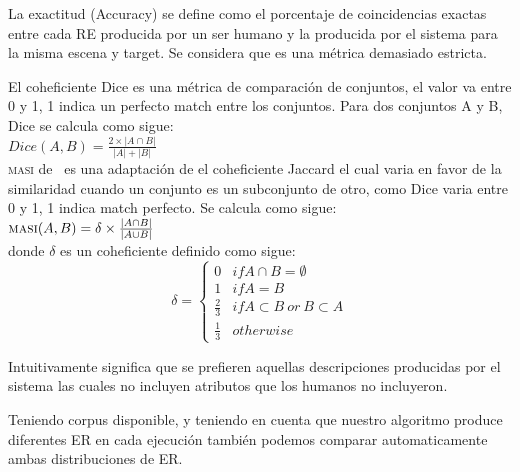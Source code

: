 La exactitud (Accuracy) se define como el porcentaje de coincidencias exactas entre cada RE producida por un ser humano y la producida por el sistema para la misma escena y target. Se considera que es una m\'etrica demasiado estricta.

El coheficiente Dice es una m\'etrica de comparaci\'on de conjuntos, el valor va entre 0 y 1, 1 indica un perfecto match entre los conjuntos. Para dos conjuntos A y B, Dice se calcula como sigue:\\

$Dice(A,B) = \frac{2\times|A \cap B|}{|A|+|B|}$\\

\textsc{masi} de \cite{masi}~es una adaptaci\'on de el coheficiente Jaccard el cual varia en favor de la similaridad cuando un conjunto es un subconjunto de otro, como Dice varia entre 0 y 1, 1 indica match perfecto. Se calcula como sigue:\\

$\textsc{masi}(A,B) = \delta \times \frac{|A \cap B|}{|A \cup B|}$ \\


donde $\delta$ es un coheficiente definido como sigue:\\


 \begin{equation}
     \delta  = \left\{
	       \begin{array}{ll}
		 0      & if A \cap B = \emptyset \\
		 1 & if A = B  \\
		 \frac{2}{3}     & if A \subset B ~or~ B \subset A\\
		 \frac{1}{3}     & otherwise
	       \end{array}
	     \right.
 \end{equation}

Intuitivamente significa que se prefieren aquellas descripciones producidas por el sistema las cuales no incluyen atributos que los humanos no incluyeron.

Teniendo corpus disponible, y teniendo en cuenta que nuestro algoritmo produce diferentes ER en cada ejecuci\'on tambi\'en podemos comparar automaticamente ambas distribuciones de ER.


